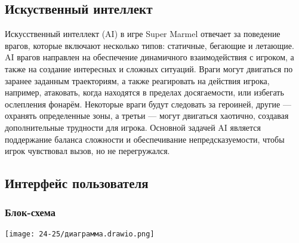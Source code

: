 \documentclass[article,12pt, fleqn]{article}
\begin{document}
\begin{itemize}
\subsection{Искуственный интеллект}
Искусственный интеллект (AI) в игре Super Marmel отвечает за поведение врагов, которые включают несколько типов: статичные, бегающие и летающие. AI врагов направлен на обеспечение динамичного взаимодействия с игроком, а также на создание интересных и сложных ситуаций. Враги могут двигаться по заранее заданным траекториям, а также реагировать на действия игрока, например, атаковать, когда находятся в пределах досягаемости, или избегать ослепления фонарём. Некоторые враги будут следовать за героиней, другие — охранять определенные зоны, а третьи — могут двигаться хаотично, создавая дополнительные трудности для игрока. Основной задачей AI является поддержание баланса сложности и обеспечивание непредсказуемости, чтобы игрок чувствовал вызов, но не перегружался.

\subsection{Интерфейс пользователя}
\subsubsection{Блок-схема}
\begin{center}
    \texttt{[image: 24-25/диаграмма.drawio.png]}
\end{center}


\end{itemize}
\end{document}
